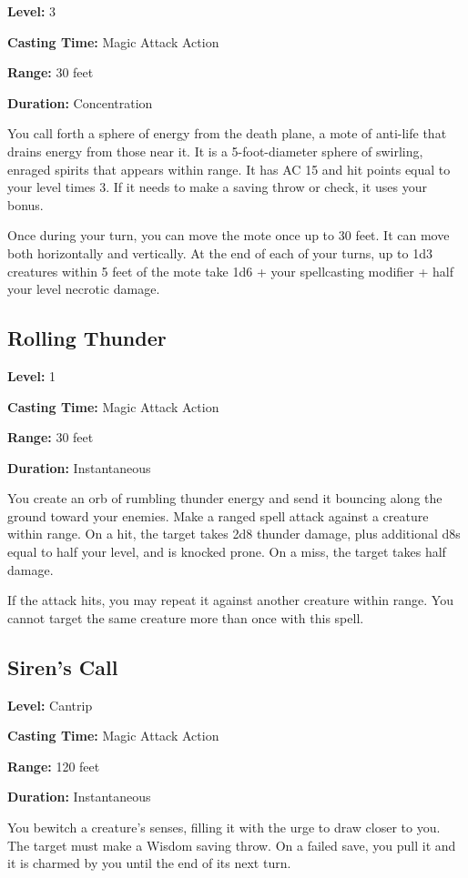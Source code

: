 \documentclass[12pt,letterpaper,twocolumn,openany,nodeprecatedcode,bg=none]{dndbook}
\begin{document}
\textbf{Level:} 3

\textbf{Casting Time:} Magic Attack Action

\textbf{Range:} 30 feet

\textbf{Duration:} Concentration

You call forth a sphere of energy from the death plane, a mote of
anti-life that drains energy from those near it. It is a 5-foot-diameter
sphere of swirling, enraged spirits that appears within range. It has AC
15 and hit points equal to your level times 3. If it needs to make a
saving throw or check, it uses your bonus.

Once during your turn, you can move the mote once up to 30 feet. It can
move both horizontally and vertically. At the end of each of your turns,
up to 1d3 creatures within 5 feet of the mote take 1d6 + your
spellcasting modifier + half your level necrotic damage.

\subsection{Rolling Thunder}\label{rolling-thunder}

\textbf{Level:} 1

\textbf{Casting Time:} Magic Attack Action

\textbf{Range:} 30 feet

\textbf{Duration:} Instantaneous

You create an orb of rumbling thunder energy and send it bouncing along
the ground toward your enemies. Make a ranged spell attack against a
creature within range. On a hit, the target takes 2d8 thunder damage,
plus additional d8s equal to half your level, and is knocked prone. On a
miss, the target takes half damage.

If the attack hits, you may repeat it against another creature within
range. You cannot target the same creature more than once with this
spell.

\subsection{Siren's Call}\label{sirens-call}

\textbf{Level:} Cantrip

\textbf{Casting Time:} Magic Attack Action

\textbf{Range:} 120 feet

\textbf{Duration:} Instantaneous

You bewitch a creature's senses, filling it with the urge to draw closer
to you. The target must make a Wisdom saving throw. On a failed save,
you pull it and it is charmed by you until the end of its next turn.
\end{document}
